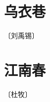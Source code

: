 \documentclass[12pt,UTF-8,openany]{ctexbook}
\begin{document}
\vspace{8pt}


\section{乌衣巷}

\begin{center}
    \vspace{10pt}
    
    \begin{normalsize}
        
        〔刘禹锡〕
        
    \end{normalsize}
    
    \vspace{8pt}
    
    \begin{large}
        
        
        
    \end{large}
    
\end{center}

\vspace{8pt}


\section{江南春}

\begin{center}
    \vspace{10pt}
    
    \begin{normalsize}
        
        〔杜牧〕
        
    \end{normalsize}
    
    \vspace{8pt}
    
    \begin{large}
        
        
        
    \end{large}
    
\end{center}
\end{document}
